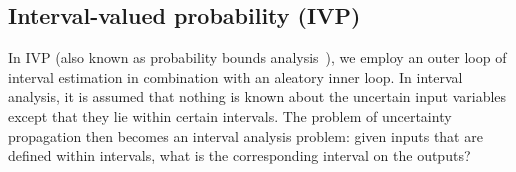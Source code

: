 \subsection{Interval-valued probability (IVP)} \label{adv_models:mixed_uq:ivp}

In IVP (also known as probability bounds
analysis~\cite{Fer06,KaKiVeAj09,Aug07}), we employ an outer loop
of interval estimation in combination with an aleatory inner loop.
In interval analysis, it is assumed that nothing is known
about the uncertain input variables except that they lie within
certain intervals.  The problem of uncertainty propagation then
becomes an interval analysis problem: given inputs that are defined
within intervals, what is the corresponding interval on the outputs?

